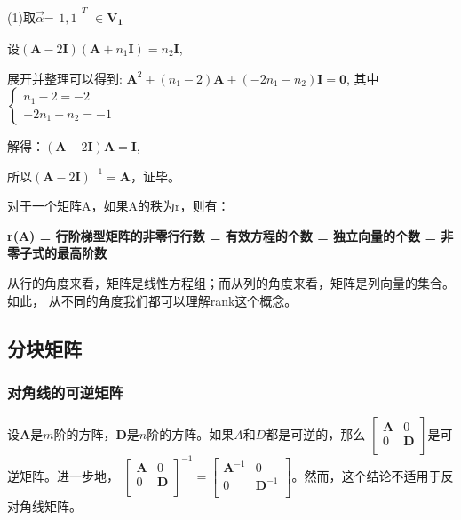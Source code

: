 \documentclass{ctexart}
\begin{document}
        \subsection{}
            \begin{mdframed}
                (1)取$\vec{\alpha}$=$\begin{matrix}
                    1,1
                \end{matrix}^{T}$
                $\in\mathbf{V_1}$
            \end{mdframed}







            设$(\mathbf{A}-2\mathbf{I})(\mathbf{A}+n_1\mathbf{I})=n_2\mathbf{I}$,
            
            展开并整理可以得到:
            $\mathbf{A}^2+(n_1-2)\mathbf{A}+(-2n_1-n_2)\mathbf{I}=\mathbf{0}$,
            其中$\begin{cases}
                n_1-2=-2\\
                -2n_1-n_2=-1
            \end{cases}$
            
            解得：$(\mathbf{A}-2\mathbf{I})\mathbf{A}=\mathbf{I}$,
            
            所以$(\mathbf{A}-2\mathbf{I})^{-1} = \mathbf{A}$，证毕。
            
        对于一个矩阵A，如果A的秩为r，则有：
        
        \textbf{\fangsong r(A) = 行阶梯型矩阵的非零行行数 = 有效方程的个数 = 独立向量的个数 = 非零子式的最高阶数}
        
        从行的角度来看，矩阵是线性方程组；而从列的角度来看，矩阵是列向量的集合。如此，
        从不同的角度我们都可以理解rank这个概念。
        \subsection{分块矩阵}
            \subsubsection{对角线的可逆矩阵}
            设$\mathbf{A}$是$m$阶的方阵，$\mathbf{D}$是$n$阶的方阵。如果$A$和$D$都是可逆的，那么
            $\begin{bmatrix}
                \mathbf{A} & 0 \\
                0 & \mathbf{D} \\
            \end{bmatrix}$是可逆矩阵。进一步地，
            $
            \begin{bmatrix}
                \mathbf{A} & 0 \\
                0 & \mathbf{D} \\
            \end{bmatrix}^{-1} = \begin{bmatrix}
                \mathbf{A}^{-1} & 0 \\
                0 & \mathbf{D}^{-1} \\
            \end{bmatrix}
            $。然而，这个结论不适用于反对角线矩阵。
\end{document}
